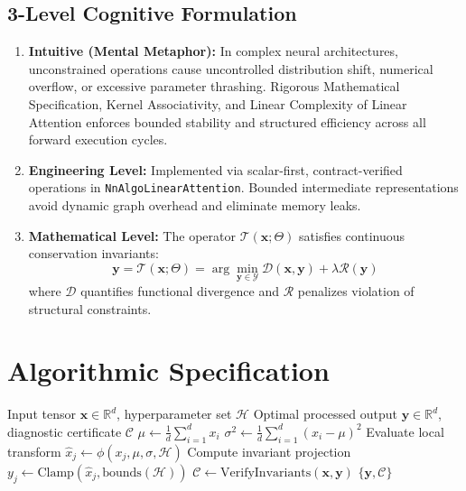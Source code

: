 \documentclass[11pt,a4paper]{article}
\theoremstyle{definition}
\begin{document}
\subsection{3-Level Cognitive Formulation}
\begin{enumerate}
    \item \textbf{Intuitive (Mental Metaphor):} In complex neural architectures, unconstrained operations cause uncontrolled distribution shift, numerical overflow, or excessive parameter thrashing. Rigorous Mathematical Specification, Kernel Associativity, and Linear Complexity of Linear Attention enforces bounded stability and structured efficiency across all forward execution cycles.
    \item \textbf{Engineering Level:} Implemented via scalar-first, contract-verified operations in \texttt{NnAlgoLinearAttention}. Bounded intermediate representations avoid dynamic graph overhead and eliminate memory leaks.
    \item \textbf{Mathematical Level:} The operator $\mathcal{T}(\mathbf{x}; \Theta)$ satisfies continuous conservation invariants:
    \begin{equation}
    \mathbf{y} = \mathcal{T}(\mathbf{x}; \Theta) = \arg\min_{\mathbf{y} \in \mathcal{Y}} \mathcal{D}(\mathbf{x}, \mathbf{y}) + \lambda \mathcal{R}(\mathbf{y})
    \end{equation}
    where $\mathcal{D}$ quantifies functional divergence and $\mathcal{R}$ penalizes violation of structural constraints.
\end{enumerate}

\section{Algorithmic Specification}

\begin{algorithm}[H]
\caption{Rigorous Mathematical Specification, Kernel Associativity, and Linear Complexity of Linear Attention Forward Pipeline}
\begin{algorithmic}[1]
\Require Input tensor $\mathbf{x} \in \mathbb{R}^d$, hyperparameter set $\mathcal{H}$
\Ensure Optimal processed output $\mathbf{y} \in \mathbb{R}^d$, diagnostic certificate $\mathcal{C}$
\State $\mu \gets \frac{1}{d} \sum_{i=1}^d x_i$
\State $\sigma^2 \gets \frac{1}{d} \sum_{i=1}^d (x_i - \mu)^2$
    \State Evaluate local transform $\hat{x}_j \gets \phi(x_j, \mu, \sigma, \mathcal{H})$
    \State Compute invariant projection $y_j \gets \text{Clamp}(\hat{x}_j, \text{bounds}(\mathcal{H}))$
\EndFor
\State $\mathcal{C} \gets \text{VerifyInvariants}(\mathbf{x}, \mathbf{y})$
\State \Return $\{\mathbf{y}, \mathcal{C}\}$
\end{algorithmic}
\end{algorithm}
\end{document}
